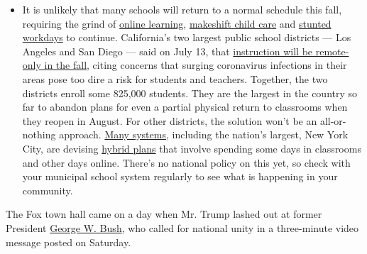 \begin{itemize}
  \begin{itemize}
  \tightlist
  \item
    It is unlikely that many schools will return to a normal schedule
    this fall, requiring the grind of
    \href{https://www.nytimes3xbfgragh.onion/2020/06/05/us/coronavirus-education-lost-learning.html?action=click\&pgtype=Article\&state=default\&region=MAIN_CONTENT_3\&context=storylines_faq}{online
    learning},
    \href{https://www.nytimes3xbfgragh.onion/2020/05/29/us/coronavirus-child-care-centers.html?action=click\&pgtype=Article\&state=default\&region=MAIN_CONTENT_3\&context=storylines_faq}{makeshift
    child care} and
    \href{https://www.nytimes3xbfgragh.onion/2020/06/03/business/economy/coronavirus-working-women.html?action=click\&pgtype=Article\&state=default\&region=MAIN_CONTENT_3\&context=storylines_faq}{stunted
    workdays} to continue. California's two largest public school
    districts --- Los Angeles and San Diego --- said on July 13, that
    \href{https://www.nytimes3xbfgragh.onion/2020/07/13/us/lausd-san-diego-school-reopening.html?action=click\&pgtype=Article\&state=default\&region=MAIN_CONTENT_3\&context=storylines_faq}{instruction
    will be remote-only in the fall}, citing concerns that surging
    coronavirus infections in their areas pose too dire a risk for
    students and teachers. Together, the two districts enroll some
    825,000 students. They are the largest in the country so far to
    abandon plans for even a partial physical return to classrooms when
    they reopen in August. For other districts, the solution won't be an
    all-or-nothing approach.
    \href{https://bioethics.jhu.edu/research-and-outreach/projects/eschool-initiative/school-policy-tracker/}{Many
    systems}, including the nation's largest, New York City, are
    devising
    \href{https://www.nytimes3xbfgragh.onion/2020/06/26/us/coronavirus-schools-reopen-fall.html?action=click\&pgtype=Article\&state=default\&region=MAIN_CONTENT_3\&context=storylines_faq}{hybrid
    plans} that involve spending some days in classrooms and other days
    online. There's no national policy on this yet, so check with your
    municipal school system regularly to see what is happening in your
    community.
  \end{itemize}
\end{itemize}

The Fox town hall came on a day when Mr. Trump lashed out at former
President
\href{https://www.nytimes3xbfgragh.onion/topic/person/george-w-bush}{George
W. Bush}, who called for national unity in a three-minute video message
posted on Saturday.

